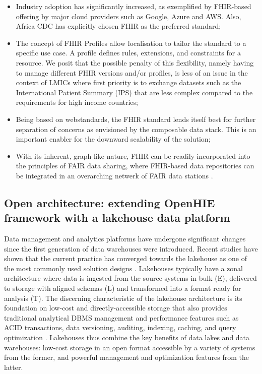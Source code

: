 \documentclass[
  authoryear]{elsarticle}
\providecommand{\tightlist}{%
  \setlength{\itemsep}{0pt}\setlength{\parskip}{0pt}}\usepackage{longtable,booktabs,array}
\begin{document}
\begin{itemize}
\tightlist
\item
  Industry adoption has significantly increased, as exemplified by
  FHIR-based offering by major cloud providers such as Google, Azure and
  AWS. Also, Africa CDC has explicitly chosen FHIR as the preferred
  standard;
\item
  The concept of FHIR Profiles allow localisation to tailor the standard
  to a specific use case. A profile defines rules, extensions, and
  constraints for a resource. We posit that the possible penalty of this
  flexibility, namely having to manage different FHIR versions and/or
  profiles, is less of an issue in the context of LMICs where first
  priority is to exchange datasets such as the International Patient
  Summary (IPS) that are less complex compared to the requirements for
  high income countries;
\item
  Being based on webstandards, the FHIR standard lends itself best for
  further separation of concerns as envisioned by the composable data
  stack. This is an important enabler for the downward scalability of
  the solution;
\item
  With its inherent, graph-like nature, FHIR can be readily incorporated
  into the principles of FAIR data sharing, where FHIR-based data
  repositories can be integrated in an overarching netwerk of FAIR data
  stations \citep{sinaci2023data, pedrera-jimenez2023can}.
\end{itemize}

\subsection{Open architecture: extending OpenHIE framework with a
lakehouse data
platform}\label{open-architecture-extending-openhie-framework-with-a-lakehouse-data-platform}

Data management and analytics platforms have undergone significant
changes since the first generation of data warehouses were introduced.
Recent studies have shown that the current practice has converged
towards the lakehouse as one of the most commonly used solution designs
\citep{armbrust2021lakehouse, hai2023data, harby2022data}. Lakehouses
typically have a zonal architecture \citep{hai2023data} where data is
ingested from the source systems in bulk (E), delivered to storage with
aligned schemas (L) and transformed into a format ready for analysis
(T). The discerning characteristic of the lakehouse architecture is its
foundation on low-cost and directly-accessible storage that also
provides traditional analytical DBMS management and performance features
such as ACID transactions, data versioning, auditing, indexing, caching,
and query optimization \citep{armbrust2021lakehouse}. Lakehouses thus
combine the key benefits of data lakes and data warehouses: low-cost
storage in an open format accessible by a variety of systems from the
former, and powerful management and optimization features from the
latter.
\end{document}
